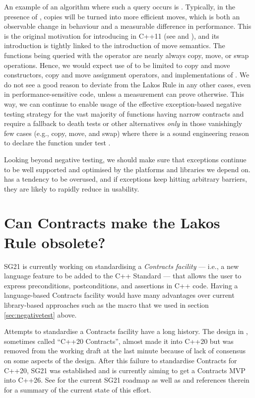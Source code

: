 An example of an algorithm where such a query occurs is . Typically, in the presence of , copies will be turned into more efficient moves, which is both an observable change in behaviour and a measurable difference in performance. This is the original motivation for introducing  in C++11 (see \cite{N2855} and \cite{N3050}), and its introduction is tightly linked to the introduction of move semantics. The functions being queried with the  operator are nearly always copy, move, or swap operations. Hence, we would expect use of  to be limited to copy and move constructors, copy and move assignment operators, and implementations of . We do not see a good reason to deviate from the Lakos Rule in any other cases, even in performance-sensitive code, unless a measurement can prove otherwise. This way, we can continue to enable usage of the effective exception-based negative testing strategy for the vast majority of functions having narrow contracts and require a fallback to death tests or other alternatives \emph{only} in those vanishingly few cases (e.g., copy, move, and swap) where there is a sound engineering reason to declare the function under test .

\pagebreak %

Looking beyond negative testing, we should make sure that exceptions continue to be well supported and optimised by the platforms and libraries we depend on.  has a tendency to be overused, and if exceptions keep hitting arbitrary  barriers, they are likely to rapidly reduce in usability. 

\section{Can Contracts make the Lakos Rule obsolete?}
\label{sec:contracts}

SG21 is currently working on standardising a \emph{Contracts facility} --- i.e., a new language feature to be added to the C++ Standard --- that allows the user to express preconditions, postconditions, and assertions in C++ code. Having a language-based Contracts facility would have many advantages over current library-based approaches such as the  macro that we used in section \ref{sec:negativetest} above.

Attempts to standardise a Contracts facility have a long history. The design in \cite{P0542R5}, sometimes called ``C++20 Contracts'', almost made it into C++20 but was removed from the working draft at the last minute because of lack of consensus on some aspects of the design. After this failure to standardise Contracts for C++20, SG21 was established and is currently aiming to get a Contracts MVP into C++26. See \cite{P2695R1} for the current SG21 roadmap as well as \cite{P2521R3} and references therein for a summary of the current state of this effort.

